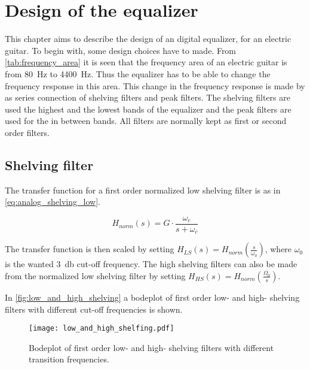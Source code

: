 \section{Design of the equalizer}
This chapter aims to describe the design of an digital equalizer, for an electric guitar. 
To begin with, some design choices have to made. From \autoref{tab:frequency_area} it is seen that the frequency area of an electric guitar is from \SI{80}{\hertz} to \SI{4400}{\hertz}. Thus the equalizer has to be able to change the frequency response in this area. This change in the frequency response is made by as series connection of shelving filters and peak filters. The shelving filters are used the highest and the lowest bands of the equalizer and the peak filters are used for the in between bands. All filters are normally kept as first or second order filters. 

\subsection{Shelving filter}
The transfer function for a first order normalized low shelving filter is as in \autoref{eq:analog_shelving_low}.

\begin{equation}\label{eq:analog_shelving_low}
        H_{norm}(s) = G \cdot \frac{\omega_c}{s+\omega_c}
    \end{equation}

    \startexplain
    \stopexplain

 The transfer function is then scaled by setting $H_{LS}(s)=H_{norm}(\frac{s}{\omega_0})$, where $\omega_0$ is the wanted \SI{3}{\decibel} cut-off frequency. The high shelving filters can also be made from the normalized low shelving filter by setting $H_{HS}(s) = H_{norm}(\frac{\Omega_0}{s})$.

    
In \autoref{fig:low_and_high_shelving} a bodeplot of first order low- and high- shelving filters with different cut-off frequencies is shown.

\begin{figure}
    \centering
        \texttt{[image: low\_and\_high\_shelfing.pdf]}
        \caption{Bodeplot of first order low- and high- shelving filters with different transition frequencies.}
        \label{fig:low_and_high_shelving}
  \end{figure} 

